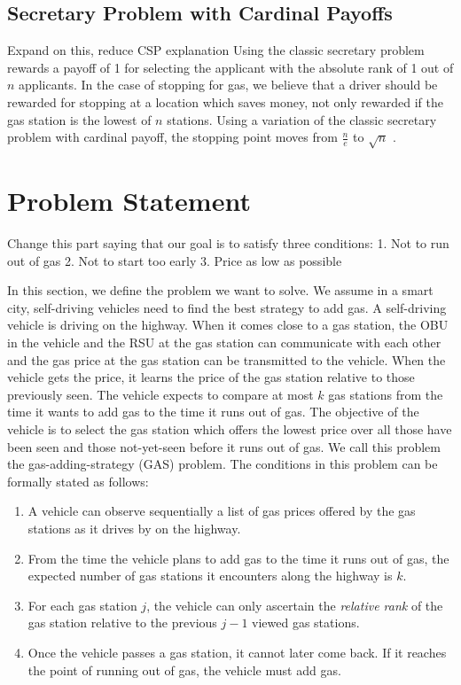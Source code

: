\documentclass[conference]{IEEEtran}
\theoremstyle{definition}
\begin{document}
\subsection{Secretary Problem with Cardinal Payoffs}
{\color{red} Expand on this, reduce CSP explanation}
Using the classic secretary problem rewards a payoff of 1 for selecting the applicant with the absolute rank of 1 out of $n$ applicants. In the case of stopping for gas, we believe that a driver should be rewarded for stopping at a location which saves money, not only rewarded if the gas station is the lowest of $n$ stations. Using a variation of the classic secretary problem with cardinal payoff, the stopping point moves from $\frac{n}{e}$ to $\sqrt{n}$ \cite{ferenstein:hal-00602313}.

\section{Problem Statement} \label{problem}
{\color{red} Change this part saying that our goal is to satisfy three conditions:
1. Not to run out of gas 2. Not to start too early 3. Price as low as possible }

In this section, we define the problem we want to solve. We assume in a smart city, self-driving vehicles need to find the best strategy to add gas. A self-driving vehicle is driving on the highway. When it comes close to a gas station, the OBU in the vehicle and the RSU at the gas station can communicate with each other and the gas price at the gas station can be transmitted to the vehicle. When the vehicle gets the price, it learns the price of the gas station relative to those previously seen. The vehicle expects to compare at most $k$ gas stations from the time it wants to add gas to the time it runs out of gas. The objective of the vehicle is to select the gas station which offers the lowest price over all those have been seen and those not-yet-seen before it runs out of gas. We call this problem the gas-adding-strategy (GAS) problem. The conditions in this problem can be formally stated as follows:

\begin{enumerate}
\item A vehicle can observe sequentially a list of gas prices offered by the gas stations as it drives by on the highway.
\item From the time the vehicle plans to add gas to the time it runs out of gas, the expected number of gas stations it encounters along the highway is $k$.
\item For each gas station $j$, the vehicle can only ascertain the {\em relative rank} of the gas station relative to the previous $j-1$ viewed gas stations.
\item Once the vehicle passes a gas station, it cannot later come back. If it reaches the point of running out of gas, the vehicle must add gas.
\end{enumerate}
\end{document}
